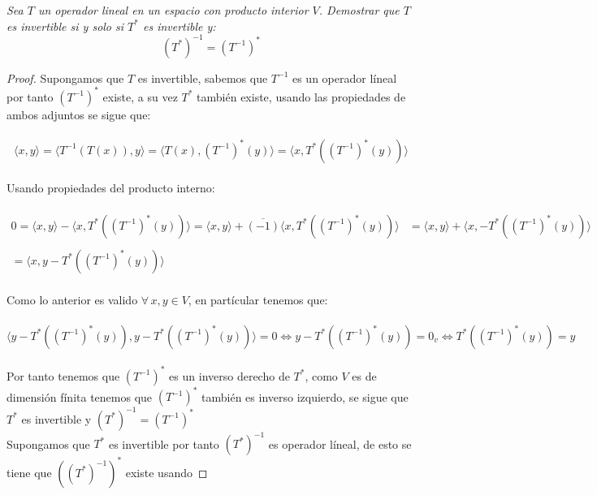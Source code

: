 \documentclass[11pt,letterpaper]{article}
\begin{document}
\begin{tcolorbox}[
	title = \textcolor{black}{\textcolor{white}{Problema 4}},]
\textit{Sea $T$ un operador lineal en un espacio con producto interior $V$. Demostrar que $T$ es invertible si y solo si $T^*$ es invertible y:
\begin{equation*}
    (T^*)^{-1}=(T^{-1})^*
\end{equation*}}
\end{tcolorbox}
\begin{proof}
    Supongamos que $T$ es invertible, sabemos que $T^{-1}$ es un operador l\'ineal por tanto $(T^{-1})^{*}$ existe, a su vez $T^{*}$ tambi\'en existe, usando las propiedades
    de ambos adjuntos se sigue que:\,\\
    \,\\
    \begin{equation*}
        \langle x,y\rangle=\langle T^{-1}(T(x)),y \rangle=\langle T(x), (T^{-1})^*(y) \rangle=\langle x, T^*((T^{-1})^*(y)) \rangle
    \end{equation*}\,\\
    Usando propiedades del producto interno:\,\\
    \,\\
    \begin{align*}
       0=\langle x,y\rangle-\langle x,T^*((T^{-1})^*(y)) \rangle=\langle x,y \rangle +\overline{(-1)}\langle x,T^*((T^{-1})^*(y)) \rangle&=\langle x,y \rangle+\langle x,-T^*((T^{-1})^*(y)) \rangle\,\\
       \,\\
       =\langle x,y-T^*((T^{-1})^*(y))\rangle
    \end{align*}\,\\
    Como lo anterior es valido $\forall\,x,y\in V$, en part\'icular tenemos que:\,\\
    \,\\
    \begin{equation*}
       \langle y-T^*((T^{-1})^*(y)),y-T^*((T^{-1})^*(y))\rangle=0\iff y-T^*((T^{-1})^*(y))=0_{v}\iff T^*((T^{-1})^*(y))=y 
    \end{equation*}\,\\
    Por tanto tenemos que $(T^{-1})^*$ es un inverso derecho de $T^{*}$, como $V$ es de dimensi\'on f\'inita tenemos que $(T^{-1})^*$ tambi\'en es inverso izquierdo, se sigue
    que $T^*$ es invertible y $(T^{*})^{-1}=(T^{-1})^*$\,\\
    \newpage
    Supongamos que $T^{*}$ es invertible por tanto $(T^{*})^{-1}$ es operador l\'ineal, de esto se tiene que $((T^*)^{-1})^{*}$ existe usando 

\end{proof}
\end{document}
